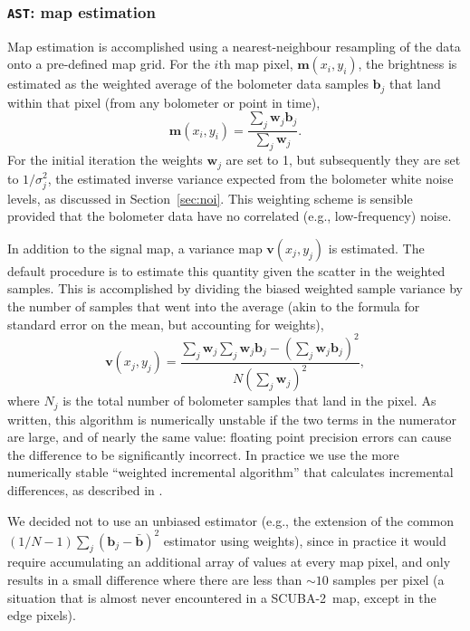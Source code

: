 \documentclass[useAMS,usenatbib,nofootinbib]{mn2e}
\newcommand{\scuba}{SCUBA-2}
\newcommand{\model}[1]{\texttt{#1}}
\begin{document}
\subsubsection{\model{AST}: map estimation}
\label{sec:ast}

Map estimation is accomplished using a nearest-neighbour resampling of
the data onto a pre-defined map grid. For the $i$th map pixel,
$\mathbf{m}(x_i,y_i)$, the brightness is estimated as the weighted
average of the bolometer data samples $\mathbf{b}_j$ that land within
that pixel (from any bolometer or point in time),
%
\begin{equation}
  \mathbf{m}(x_i,y_i) = \frac{\sum_j \mathbf{w}_j \mathbf{b}_j }
                             { \sum_j \mathbf{w}_j } .
\end{equation}
%
For the initial iteration the weights $\mathbf{w}_j$ are set to 1, but
subsequently they are set to $1/\sigma_j^2$, the estimated inverse
variance expected from the bolometer white noise levels, as discussed
in Section~\ref{sec:noi}. This weighting scheme is sensible provided
that the bolometer data have no correlated (e.g., low-frequency)
noise.

In addition to the signal map, a variance map $\mathbf{v}(x_j,y_j)$ is
estimated. The default procedure is to estimate this quantity given
the scatter in the weighted samples. This is accomplished by dividing
the biased weighted sample variance by the number of samples that went
into the average (akin to the formula for standard error on the mean,
but accounting for weights),
%
\begin{equation}
\label{eq:varmap}
\mathbf{v}(x_j,y_j) = \frac{\sum_j \mathbf{w}_j
                            \sum_j \mathbf{w}_j \mathbf{b}_j -
                            \left( \sum_j \mathbf{w}_j \mathbf{b}_j \right)^2 }
                           { N \left( \sum_j \mathbf{w}_j \right)^2 },
\end{equation}
%
where $N_j$ is the total number of bolometer samples that land in the
pixel. As written, this algorithm is numerically unstable if the two
terms in the numerator are large, and of nearly the same value:
floating point precision errors can cause the difference to be
significantly incorrect. In practice we use the more numerically
stable ``weighted incremental algorithm'' that calculates incremental
differences, as described in \citet{west1979}.

We decided not to use an unbiased estimator (e.g., the extension of
the common $(1/N-1)\sum_j (\mathbf{b}_j - \bar{\mathbf{b}})^2$
estimator using weights), since in practice it would require
accumulating an additional array of values at every map pixel, and
only results in a small difference where there are less than $\sim10$
samples per pixel (a situation that is almost never encountered in a
\scuba\ map, except in the edge pixels).
\end{document}
